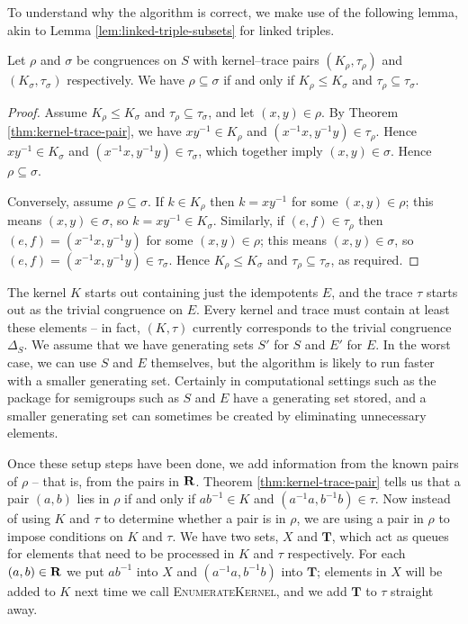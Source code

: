 
To understand why the algorithm is correct, we make use of the following lemma,
akin to Lemma \ref{lem:linked-triple-subsets} for linked triples.

\begin{lemma}
  \label{lem:kertr-subsets}
  Let $\rho$ and $\sigma$ be congruences on $S$ with kernel--trace pairs
  $(K_\rho, \tau_\rho)$ and $(K_\sigma, \tau_\sigma)$ respectively.  We have
  $\rho \subseteq \sigma$ if and only if $K_\rho \leq K_\sigma$ and
  $\tau_\rho \subseteq \tau_\sigma$.
  \begin{proof}
    Assume $K_\rho \leq K_\sigma$ and $\tau_\rho \subseteq \tau_\sigma$, and let
    $(x,y) \in \rho$.  By Theorem \ref{thm:kernel-trace-pair}, we have
    $xy^{-1} \in K_\rho$ and $(x^{-1}x, y^{-1}y) \in \tau_\rho$.  Hence
    $xy^{-1} \in K_\sigma$ and $(x^{-1}x, y^{-1}y) \in \tau_\sigma$, which
    together imply $(x,y) \in \sigma$.  Hence $\rho \subseteq \sigma$.

    Conversely, assume $\rho \subseteq \sigma$.  If $k \in K_\rho$ then
    $k=xy^{-1}$ for some $(x,y) \in \rho$; this means $(x,y) \in \sigma$, so
    $k=xy^{-1} \in K_\sigma$.  Similarly, if $(e,f) \in \tau_\rho$ then
    $(e,f) = (x^{-1}x, y^{-1}y)$ for some $(x,y) \in \rho$; this means
    $(x,y) \in \sigma$, so $(e,f) = (x^{-1}x, y^{-1}y) \in \tau_\sigma$.  Hence
    $K_\rho \leq K_\sigma$ and $\tau_\rho \subseteq \tau_\sigma$, as
    required.
  \end{proof}
\end{lemma}

The kernel $K$ starts out containing just the idempotents $E$, and the trace
$\tau$ starts out as the trivial congruence on $E$.  Every kernel and trace must
contain at least these elements -- in fact, $(K, \tau)$ currently corresponds to
the trivial congruence $\Delta_S$.  We assume that we have generating sets $S'$
for $S$ and $E'$ for $E$.  In the worst case, we can use $S$ and $E$ themselves,
but the algorithm is likely to run faster with a smaller generating set.
Certainly in computational settings such as the \Semigroups{} package for \GAP{}
\cite{semigroups} semigroups such as $S$ and $E$ have a generating set stored,
and a smaller generating set can sometimes be created by eliminating unnecessary
elements.

Once these setup steps have been done, we add information from the known pairs
of $\rho$ -- that is, from the pairs in $\mathbf{R}$.  Theorem
\ref{thm:kernel-trace-pair} tells us that a pair $(a,b)$ lies in $\rho$ if and
only if $ab^{-1} \in K$ and $(a^{-1}a, b^{-1}b) \in \tau$.  Now instead of using
$K$ and $\tau$ to determine whether a pair is in $\rho$, we are using a pair in
$\rho$ to impose conditions on $K$ and $\tau$.  We have two sets, $X$ and
$\mathbf{T}$, which act as queues for elements that need to be processed in $K$
and $\tau$ respectively.  For each $(a,b) \in \mathbf{R}$ we put $ab^{-1}$ into
$X$ and $(a^{-1}a, b^{-1}b)$ into $\mathbf{T}$; elements in $X$ will be added
to $K$ next time we call \textsc{EnumerateKernel}, and we add $\mathbf{T}$ to
$\tau$ straight away.

